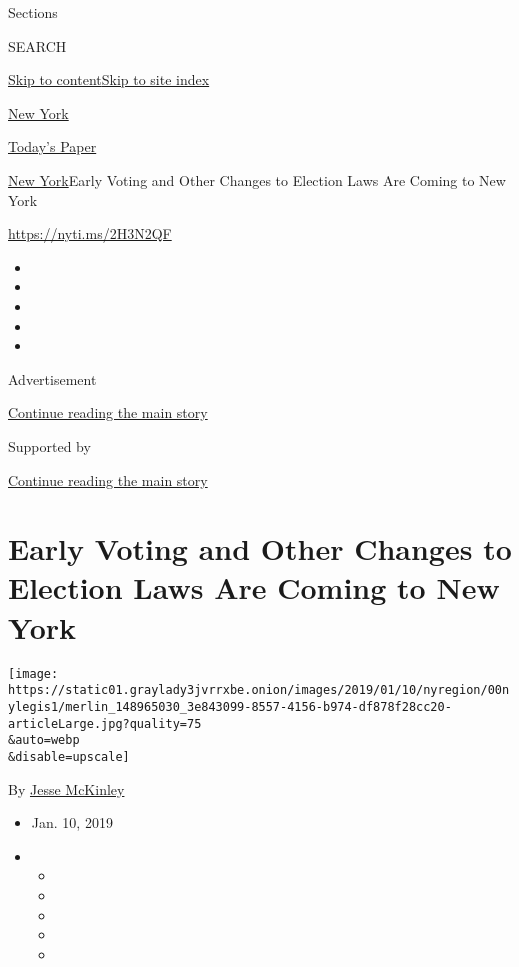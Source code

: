 Sections

SEARCH

\protect\hyperlink{site-content}{Skip to
content}\protect\hyperlink{site-index}{Skip to site index}

\href{https://www.nytimes3xbfgragh.onion/section/nyregion}{New York}

\href{https://myaccount.nytimes3xbfgragh.onion/auth/login?response_type=cookie\&client_id=vi}{}

\href{https://www.nytimes3xbfgragh.onion/section/todayspaper}{Today's
Paper}

\href{/section/nyregion}{New York}\textbar{}Early Voting and Other
Changes to Election Laws Are Coming to New York

\url{https://nyti.ms/2H3N2QF}

\begin{itemize}
\item
\item
\item
\item
\item
\end{itemize}

Advertisement

\protect\hyperlink{after-top}{Continue reading the main story}

Supported by

\protect\hyperlink{after-sponsor}{Continue reading the main story}

\hypertarget{early-voting-and-other-changes-to-election-laws-are-coming-to-new-york}{%
\section{Early Voting and Other Changes to Election Laws Are Coming to
New
York}\label{early-voting-and-other-changes-to-election-laws-are-coming-to-new-york}}

\texttt{[image: https://static01.graylady3jvrrxbe.onion/images/2019/01/10/nyregion/00nylegis1/merlin\_148965030\_3e843099-8557-4156-b974-df878f28cc20-articleLarge.jpg?quality=75\\\&auto=webp\\\&disable=upscale]}

By \href{https://www.nytimes3xbfgragh.onion/by/jesse-mckinley}{Jesse
McKinley}

\begin{itemize}
\item
  Jan. 10, 2019
\item
  \begin{itemize}
  \item
  \item
  \item
  \item
  \item
  \end{itemize}
\end{itemize}

